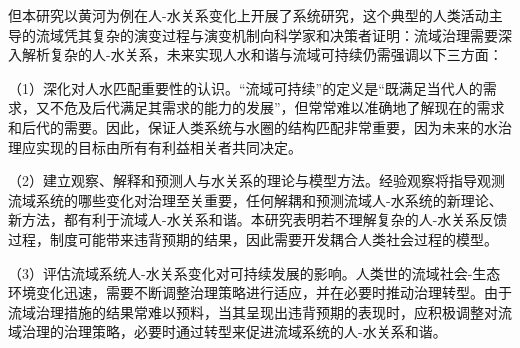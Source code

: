 但本研究以黄河为例在人-水关系变化上开展了系统研究，这个典型的人类活动主导的流域凭其复杂的演变过程与演变机制向科学家和决策者证明：流域治理需要深入解析复杂的人-水关系，未来实现人水和谐与流域可持续仍需强调以下三方面：

（1）深化对人水匹配重要性的认识。“流域可持续”的定义是“既满足当代人的需求，又不危及后代满足其需求的能力的发展”，但常常难以准确地了解现在的需求和后代的需要。因此，保证人类系统与水圈的结构匹配非常重要，因为未来的水治理应实现的目标由所有有利益相关者共同决定。

（2）建立观察、解释和预测人与水关系的理论与模型方法。经验观察将指导观测流域系统的哪些变化对治理至关重要，任何解耦和预测流域人-水系统的新理论、新方法，都有利于流域人-水关系和谐。本研究表明若不理解复杂的人-水关系反馈过程，制度可能带来违背预期的结果，因此需要开发耦合人类社会过程的模型。

（3）评估流域系统人-水关系变化对可持续发展的影响。人类世的流域社会-生态环境变化迅速，需要不断调整治理策略进行适应，并在必要时推动治理转型。由于流域治理措施的结果常难以预料，当其呈现出违背预期的表现时，应积极调整对流域治理的治理策略，必要时通过转型来促进流域系统的人-水关系和谐。
